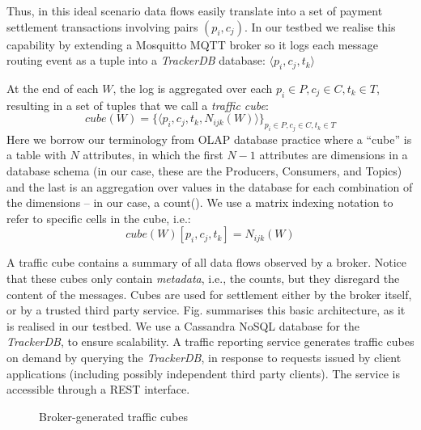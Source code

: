\documentclass[conference]{IEEEtran}
\begin{document}
Thus, in this ideal scenario data flows easily translate into a set of payment settlement transactions involving pairs $(p_i, c_j)$.
In our testbed we realise this capability by extending a Mosquitto MQTT broker so it logs each message routing event as a tuple into a \textit{TrackerDB} database:
$ \langle p_i, c_j, t_k \rangle $

At the end of each $W$, the log is aggregated over each $p_i \in P, c_j \in C, t_k \in T$, resulting in a set of tuples that we call a \textit{traffic cube}:
\begin{equation}\label{eq:cube}
\mathit{cube}(W) = \{ \langle p_i, c_j, t_k, N_{ijk}(W) \rangle \}_{p_i \in P, c_j \in C, t_k \in T}
\end{equation}
Here we borrow our terminology from OLAP database practice where a  ``cube'' is a table with $ N $ attributes, in which the first $ N-1 $ attributes are  dimensions in a database schema (in our case, these are the Producers, Consumers, and Topics) and the last is an aggregation over values in the database for each combination of the dimensions -- in our case, a count().
We use a matrix indexing notation to refer to specific cells in the cube, i.e.:
\[ \mathit{cube}(W)[p_i, c_j, t_k] = N_{ijk}(W) \] 

A traffic cube contains a summary  of all data flows observed by a broker. Notice that these cubes only contain \textit{metadata}, i.e., the counts, but they disregard the content of the messages.
%
Cubes are used for settlement either by the broker itself, or by a trusted third party service. Fig.  summarises this basic architecture, as it is realised in our testbed. 
We use a Cassandra NoSQL database for the \textit{TrackerDB}, to ensure scalability. 
A traffic reporting service generates traffic cubes on demand by querying the \textit{TrackerDB}, in response to requests issued by client applications (including possibly independent third party clients). The service is accessible through a REST interface.

\begin{figure}
	\caption{Broker-generated traffic cubes}
	\label{fig:cubes}
\end{figure}
\end{document}
